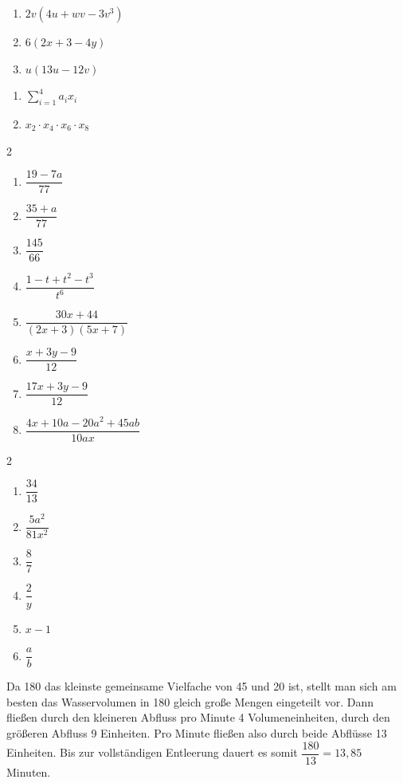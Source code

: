 \begin{enumerate}[label=\alph*)]
  \item $2v(4u + wv - 3v^3)$
  \item $6(2x + 3 - 4y)$
  \item $u(13u - 12v)$
\end{enumerate}

\begin{enumerate}[label=\alph*)]
  \item $\sum_{i=1}^{4} a_i x_i$
  \item $x_2 \cdot x_4 \cdot x_6 \cdot x_8$
\end{enumerate}

\begin{multicols}{2}
\begin{enumerate}[label=\alph*)]
  \item $\dfrac{19 - 7a}{77}$
  \item $\dfrac{35 + a}{77}$
  \item $\dfrac{145}{66}$
  \item $\dfrac{1 - t + t^2 - t^3}{t^6}$
  \item $\dfrac{30x + 44}{(2x+3)(5x+7)}$
  \item $\dfrac{x + 3y - 9}{12}$
  \item $\dfrac{17x + 3y - 9}{12}$
  \item $\dfrac{4x + 10a - 20a^2 + 45ab}{10ax}$
\end{enumerate}
\end{multicols}

\begin{multicols}{2}
\begin{enumerate}[label=\alph*)]
  \item $\dfrac{34}{13}$
  \item $\dfrac{5a^2}{81x^2}$
  \item $\dfrac{8}{7}$
  \item $\dfrac{2}{y}$
  \item $x - 1$
  \item $\dfrac{a}{b}$
\end{enumerate}
\end{multicols}

Da 180 das kleinste gemeinsame Vielfache von 45 und 20 ist, stellt man sich am besten das Wasservolumen in 180 gleich große Mengen eingeteilt vor. Dann fließen durch den kleineren Abfluss pro Minute 4 Volumeneinheiten, durch den größeren Abfluss 9 Einheiten. Pro Minute fließen also durch beide Abflüsse 13 Einheiten. Bis zur vollständigen Entleerung dauert es somit $\dfrac{180}{13} = 13{,}85$ Minuten.

